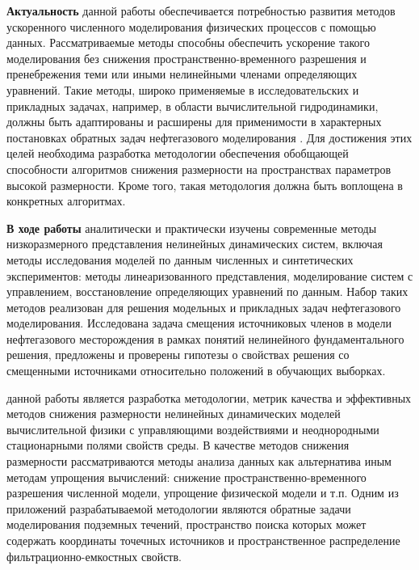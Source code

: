 
{\actuality}
\textbf{Актуальность} данной работы обеспечивается потребностью развития методов ускоренного численного моделирования физических процессов с помощью данных.
Рассматриваемые методы способны обеспечить ускорение такого моделирования без снижения пространственно-временного разрешения и пренебрежения теми или иными нелинейными членами определяющих уравнений.
Такие методы, широко применяемые в исследовательских и прикладных задачах, например, в области вычислительной гидродинамики, должны быть адаптированы и расширены для применимости в характерных постановках обратных задач нефтегазового моделирования {\cite{Elizarev2020,Elizarev_2021}}.
Для достижения этих целей необходима разработка методологии обеспечения обобщающей способности алгоритмов снижения размерности на пространствах параметров высокой размерности.
Кроме того, такая методология должна быть воплощена в конкретных алгоритмах.

{\progress}
\textbf{В ходе работы} аналитически и практически изучены современные методы низкоразмерного представления нелинейных динамических систем, включая методы исследования моделей по данным численных и синтетических экспериментов: методы линеаризованного представления, моделирование систем с управлением, восстановление определяющих уравнений по данным. Набор таких методов реализован для решения модельных и прикладных задач нефтегазового моделирования. Исследована задача смещения источниковых членов в модели нефтегазового месторождения в рамках понятий нелинейного фундаментального решения, предложены и проверены гипотезы о свойствах решения со смещенными источниками относительно положений в обучающих выборках.

{\aim} данной работы является разработка методологии, метрик качества и эффективных методов снижения размерности нелинейных динамических моделей вычислительной физики с управляющими воздействиями и неоднородными стационарными полями свойств среды.
В качестве методов снижения размерности рассматриваются методы анализа данных как альтернатива иным методам упрощения вычислений: снижение пространственно-временного разрешения численной модели, упрощение физической модели и т.п.
Одним из приложений разрабатываемой методологии являются обратные задачи моделирования подземных течений, пространство поиска которых может содержать координаты точечных источников и пространственное распределение фильтрационно-емкостных свойств.

